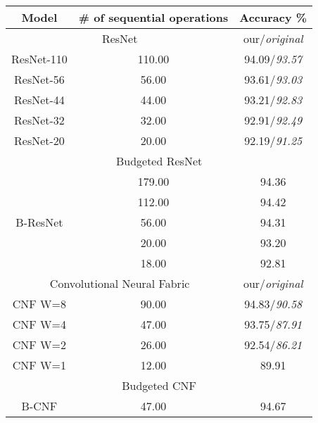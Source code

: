 \begin{table}[h]
\centering
\begin{tabular}{|c||cc|}
\hline
Model                       & \# of sequential operations & Accuracy \%  \\ \hline \hline
\multicolumn{2}{|c|}{ResNet \cite{DBLP:journals/corr/HeZRS15}}                              & our/\textit{original} \\ \hline
ResNet-110                  & 110.00                      & 94.09/\textit{93.57}  \\
ResNet-56                   & 56.00                       & 93.61/\textit{93.03}  \\
ResNet-44                   & 44.00                       & 93.21/\textit{92.83}  \\
ResNet-32                   & 32.00                       & 92.91/\textit{92.49}  \\
ResNet-20                   & 20.00                       & 92.19/\textit{91.25}  \\ \hline \hline
\multicolumn{3}{|c|}{Budgeted ResNet}                                    \\ \hline
\multirow{5}{*}{B-ResNet}	& 179.00                      & 94.36        \\
        		            & 112.00                      & 94.42        \\
		                    & 56.00                       & 94.31        \\
				            & 20.00                       & 93.20        \\
				            & 18.00                       & 92.81        \\ \hline \hline
\multicolumn{2}{|c|}{Convolutional Neural Fabric \cite{DBLP:journals/corr/SaxenaV16}}         & our/\textit{original} \\ \hline
CNF W=8                     & 90.00                       & 94.83/\textit{90.58}  \\
CNF W=4                     & 47.00                       & 93.75/\textit{87.91}  \\
CNF W=2                     & 26.00                       & 92.54/\textit{86.21}  \\
CNF W=1                     & 12.00                       & 89.91        \\ \hline \hline
\multicolumn{3}{|c|}{Budgeted CNF}                                       \\ \hline
\multirow{6}{*}{B-CNF}      & 47.00                       & 94.67        \\

\end{tabular}
\end{table}
